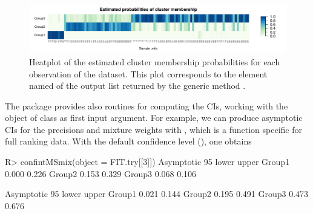 \begin{figure}[t]
\centering
\includegraphics[width=\textwidth]{figures/RJ2025_paper_zeta.pdf}
\caption{Heatplot of the estimated cluster membership probabilities for each observation of the  dataset. This plot corresponds to the element named  of the output list returned by the generic method .}
 \label{f:antifr_plot2}
\end{figure}
The package provides also routines for computing the CIs, working with the object of class  as first input argument. For example, we can produce asymptotic CIs for the precisions and mixture weights with , which is a function specific for full ranking data. With the default confidence level (), one obtains
\begin{example}
R> confintMSmix(object = FIT.try[[3]])
Asymptotic 95%
       lower upper
Group1 0.000 0.226
Group2 0.153 0.329
Group3 0.068 0.106

Asymptotic 95%
       lower upper
Group1 0.021 0.144
Group2 0.195 0.491
Group3 0.473 0.676
\end{example}

